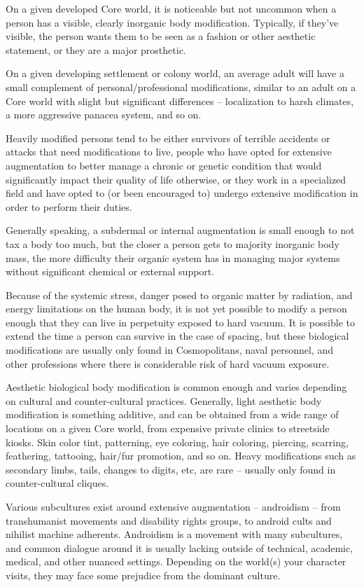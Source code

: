 On a given developed Core world, it is noticeable but not uncommon when a person has a
visible, clearly inorganic body modification. Typically, if they've visible, the person wants them to
be seen as a fashion or other aesthetic statement, or they are a major prosthetic.

On a given developing settlement or colony world, an average adult will have a small
complement of personal/professional modifications, similar to an adult on a Core world with
slight but significant differences -- localization to harsh climates, a more aggressive panacea
system, and so on.

Heavily modified persons tend to be either survivors of terrible accidents or attacks that need
modifications to live, people who have opted for extensive augmentation to better manage a
chronic or genetic condition that would significantly impact their quality of life otherwise, or they
work in a specialized field and have opted to (or been encouraged to) undergo extensive
modification in order to perform their duties.

Generally speaking, a subdermal or internal augmentation is small enough to not tax a body too
much, but the closer a person gets to majority inorganic body mass, the more difficulty their
organic system has in managing major systems without significant chemical or external support.

Because of the systemic stress, danger posed to organic matter by radiation, and energy
limitations on the human body, it is not yet possible to modify a person enough that they can live
in perpetuity exposed to hard vacuum. It is possible to extend the time a person can survive in
the case of spacing, but these biological modifications are usually only found in Cosmopolitans,
naval personnel, and other professions where there is considerable risk of hard vacuum
exposure.

Aesthetic biological body modification is common enough and varies depending on cultural and
counter-cultural practices. Generally, light aesthetic body modification is something additive, and
can be obtained from a wide range of locations on a given Core world, from expensive private
clinics to streetside kiosks. Skin color tint, patterning, eye coloring, hair coloring, piercing,
scarring, feathering, tattooing, hair/fur promotion, and so on. Heavy modifications such as
secondary limbs, tails, changes to digits, etc, are rare -- usually only found in counter-cultural
cliques.

Various subcultures exist around extensive augmentation -- androidism -- from transhumanist
movements and disability rights groups, to android cults and nihilist machine adherents.
Androidism is a movement with many subcultures, and common dialogue around it is usually
lacking outside of technical, academic, medical, and other nuanced settings. Depending on the
world(s) your character visits, they may face some prejudice from the dominant culture.

